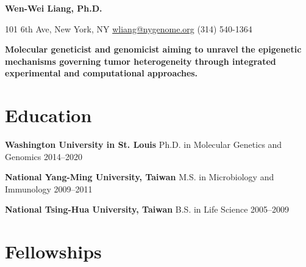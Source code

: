 \documentclass[letterpaper,11pt]{cv}
\begin{document}

\begin{minipage}[b][][c]{35em}
    \lightsourceserif\Huge\bfseries\color{color-title}
    Wen-Wei Liang, Ph.D.
\end{minipage}%
\hfill
\hspace{1em}
\begin{minipage}[b][][b]{11em}
    \raggedleft
    \small
    101 6th Ave, New York, NY \hfill
    \href{mailto:wliang@nygenome.org}{wliang@nygenome.org} \hfill
    (314) 540-1364
\end{minipage}

\vspace{2ex}

{
    \small\lightsourceserif\bfseries\color{color-title}
    Molecular geneticist and genomicist aiming to unravel the epigenetic mechanisms governing tumor heterogeneity through integrated experimental and computational approaches.\par
}

\section{Education}

\begin{entrylist}

\item \textbf{Washington University in St. Louis} \hspace{2.45em} Ph.D. in Molecular Genetics and Genomics \hfill
    2014--2020 \\

\item \textbf{National Yang-Ming University, Taiwan} \hspace{0.5em} M.S. in Microbiology and Immunology \hfill
    2009--2011 \\

\item \textbf{National Tsing-Hua University, Taiwan} \hspace{0.72em} B.S. in Life Science \hfill
    2005--2009 \\

\end{entrylist}

\section{Fellowships}
\end{document}
